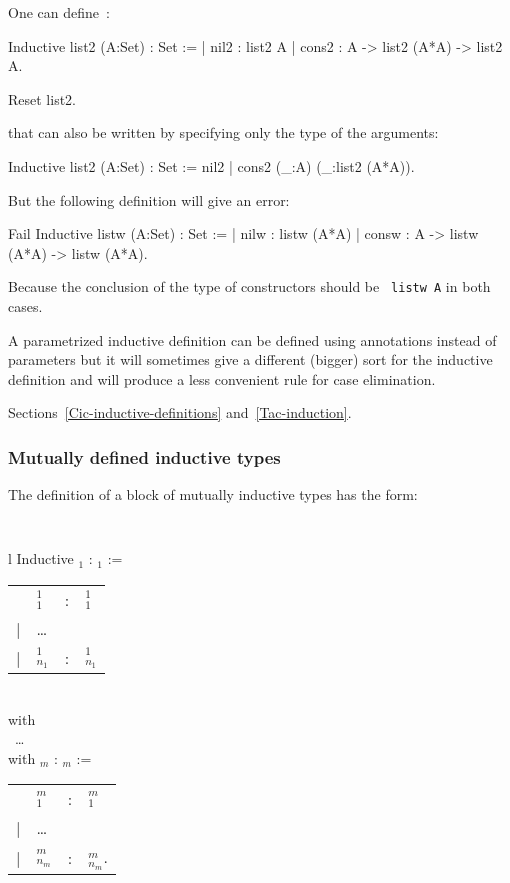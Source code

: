 One can define~:
\begin{coq_example}
Inductive list2 (A:Set) : Set :=
  | nil2 : list2 A
  | cons2 : A -> list2 (A*A) -> list2 A.
\end{coq_example}
\begin{coq_eval}
Reset list2.
\end{coq_eval}
that can also be written by specifying only the type of the arguments:
\begin{coq_example*}
Inductive list2 (A:Set) : Set := nil2 | cons2 (_:A) (_:list2 (A*A)).
\end{coq_example*}
But the following definition will give an error:
\begin{coq_example}
Fail Inductive listw (A:Set) : Set :=
  | nilw : listw (A*A)
  | consw : A -> listw (A*A) -> listw (A*A).
\end{coq_example}
Because the conclusion of the type of constructors should be {\tt
  listw A} in both cases. 

A parametrized inductive definition can be defined using
annotations instead of parameters but it will sometimes give a
different (bigger) sort for the inductive definition and will produce
a less convenient rule for case elimination.

\SeeAlso Sections~\ref{Cic-inductive-definitions} and~\ref{Tac-induction}.


\subsubsection{Mutually defined inductive types
\label{Mutual-Inductive}}

The definition of a block of mutually inductive types has the form:

\medskip
{\tt 
\begin{tabular}{l}
Inductive {\ident$_1$} : {\type$_1$} :=  \\
\begin{tabular}{clcl}
   & {\ident$_1^1$}     &:& {\type$_1^1$} \\
 | & {\ldots} && \\
 | & {\ident$_{n_1}^1$} &:& {\type$_{n_1}^1$}
\end{tabular}  \\
with\\
~{\ldots} \\
with {\ident$_m$} : {\type$_m$} := \\
\begin{tabular}{clcl}
   & {\ident$_1^m$}     &:& {\type$_1^m$} \\
 | & {\ldots} \\
 | & {\ident$_{n_m}^m$} &:& {\type$_{n_m}^m$}.
\end{tabular}
\end{tabular}
}
\medskip

